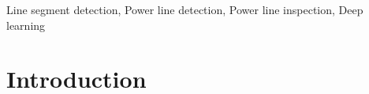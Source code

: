 \documentclass[journal]{IEEEtran}
\begin{document}
\begin{IEEEkeywords}
Line segment detection, Power line detection, Power line inspection, Deep learning
\end{IEEEkeywords}






%
\IEEEpeerreviewmaketitle



\section{Introduction}
% 
% 
% 
% 
\end{document}
